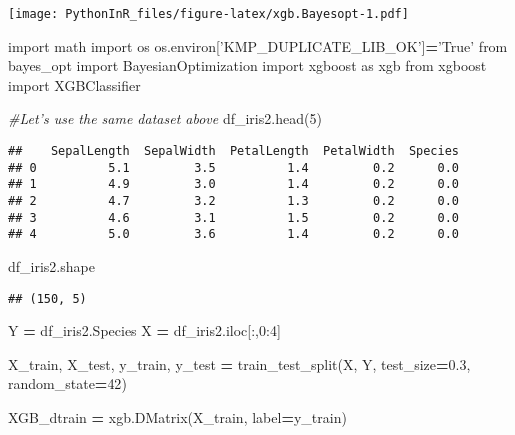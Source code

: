 \documentclass[]{article}
\newenvironment{Shaded}{\begin{snugshade}}{\end{snugshade}}
\newcommand{\CommentTok}[1]{\textcolor[rgb]{0.56,0.35,0.01}{\textit{#1}}}
\newcommand{\DecValTok}[1]{\textcolor[rgb]{0.00,0.00,0.81}{#1}}
\newcommand{\FloatTok}[1]{\textcolor[rgb]{0.00,0.00,0.81}{#1}}
\newcommand{\ImportTok}[1]{#1}
\newcommand{\NormalTok}[1]{#1}
\newcommand{\OperatorTok}[1]{\textcolor[rgb]{0.81,0.36,0.00}{\textbf{#1}}}
\newcommand{\StringTok}[1]{\textcolor[rgb]{0.31,0.60,0.02}{#1}}
\begin{document}
\texttt{[image: PythonInR\_files/figure-latex/xgb.Bayesopt-1.pdf]}

\begin{Shaded}
\begin{Highlighting}[]
\ImportTok{import}\NormalTok{ math}
\ImportTok{import}\NormalTok{ os}
\NormalTok{os.environ[}\StringTok{'KMP_DUPLICATE_LIB_OK'}\NormalTok{]}\OperatorTok{=}\StringTok{'True'}
\ImportTok{from}\NormalTok{ bayes_opt }\ImportTok{import}\NormalTok{ BayesianOptimization}
\ImportTok{import}\NormalTok{ xgboost }\ImportTok{as}\NormalTok{ xgb}
\ImportTok{from}\NormalTok{ xgboost }\ImportTok{import}\NormalTok{ XGBClassifier}

\CommentTok{#Let's use the same dataset above}
\NormalTok{df_iris2.head(}\DecValTok{5}\NormalTok{)}
\end{Highlighting}
\end{Shaded}

\begin{verbatim}
##    SepalLength  SepalWidth  PetalLength  PetalWidth  Species
## 0          5.1         3.5          1.4         0.2      0.0
## 1          4.9         3.0          1.4         0.2      0.0
## 2          4.7         3.2          1.3         0.2      0.0
## 3          4.6         3.1          1.5         0.2      0.0
## 4          5.0         3.6          1.4         0.2      0.0
\end{verbatim}

\begin{Shaded}
\begin{Highlighting}[]
\NormalTok{df_iris2.shape}
\end{Highlighting}
\end{Shaded}

\begin{verbatim}
## (150, 5)
\end{verbatim}

\begin{Shaded}
\begin{Highlighting}[]
\NormalTok{Y }\OperatorTok{=}\NormalTok{ df_iris2.Species}
\NormalTok{X }\OperatorTok{=}\NormalTok{ df_iris2.iloc[:,}\DecValTok{0}\NormalTok{:}\DecValTok{4}\NormalTok{]}

\NormalTok{X_train, X_test, y_train, y_test }\OperatorTok{=}\NormalTok{ train_test_split(X, Y, test_size}\OperatorTok{=}\FloatTok{0.3}\NormalTok{, random_state}\OperatorTok{=}\DecValTok{42}\NormalTok{)}

\NormalTok{XGB_dtrain }\OperatorTok{=}\NormalTok{ xgb.DMatrix(X_train, label}\OperatorTok{=}\NormalTok{y_train)}
\end{Highlighting}
\end{Shaded}
\end{document}

